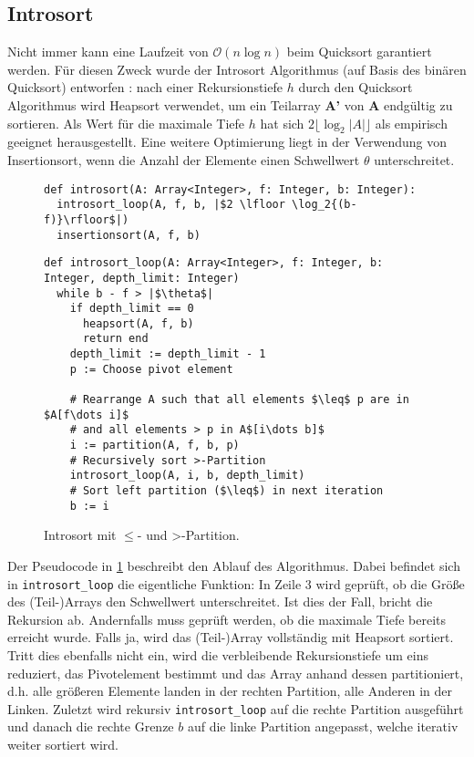 \subsection{Introsort}
\label{section:introsort}

Nicht  immer kann eine Laufzeit von $\mathcal O(n\log{n})$ beim Quicksort garantiert werden.
Für diesen Zweck wurde der Introsort Algorithmus (auf Basis des binären Quicksort) entworfen \cite{Musser97}:
nach einer Rekursionstiefe $h$ durch den Quicksort Algorithmus wird Heapsort verwendet,
um ein Teilarray \textbf{A'} von \textbf{A} endgültig zu sortieren.
Als Wert für die maximale Tiefe $h$ hat sich $2 \lfloor \log_2{|A|}\rfloor$ als empirisch geeignet herausgestellt.
Eine weitere Optimierung liegt in der Verwendung von Insertionsort,
wenn die Anzahl der Elemente einen Schwellwert $\theta$ unterschreitet.

\begin{figure}
\begin{verbatim}
def introsort(A: Array<Integer>, f: Integer, b: Integer):
  introsort_loop(A, f, b, |$2 \lfloor \log_2{(b-f)}\rfloor$|)
  insertionsort(A, f, b)
\end{verbatim}

\begin{verbatim}
def introsort_loop(A: Array<Integer>, f: Integer, b: Integer, depth_limit: Integer)
  while b - f > |$\theta$|
    if depth_limit == 0
      heapsort(A, f, b)
      return end
    depth_limit := depth_limit - 1
    p := Choose pivot element

    # Rearrange A such that all elements $\leq$ p are in $A[f\dots i]$
    # and all elements > p in A$[i\dots b]$
    i := partition(A, f, b, p)
    # Recursively sort >-Partition
    introsort_loop(A, i, b, depth_limit)
    # Sort left partition ($\leq$) in next iteration
    b := i

\end{verbatim}
\caption{Introsort mit \glqq $\leq$\grqq- und \glqq >\grqq-Partition.}
\label{alg:introsort}
\end{figure}

Der Pseudocode in \ref{alg:introsort} beschreibt den Ablauf des Algorithmus.
Dabei befindet sich in \texttt{introsort\_loop} die eigentliche Funktion: In Zeile 3 wird geprüft,
ob die Größe des (Teil-)Arrays den Schwellwert unterschreitet. Ist dies der Fall, bricht die Rekursion ab.
Andernfalls muss geprüft werden, ob die maximale Tiefe bereits erreicht wurde.
Falls ja, wird das (Teil-)Array vollständig mit Heapsort sortiert.
Tritt dies ebenfalls nicht ein, wird die verbleibende Rekursionstiefe um eins reduziert,
das Pivotelement bestimmt und das Array anhand dessen partitioniert,
d.h. alle größeren Elemente landen in der rechten Partition, alle Anderen in der Linken.
Zuletzt wird rekursiv \texttt{introsort\_loop} auf die rechte Partition ausgeführt
und danach die rechte Grenze $b$ auf die linke Partition angepasst, welche iterativ weiter sortiert wird.

